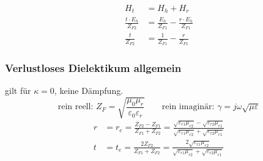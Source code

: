 %

\begin{align*}
    H_t                         & = H_h + H_r                                          \\
    \frac{t\cdot E_{h}}{Z_{F2}} & = \frac{E_{h}}{Z_{F1}} - \frac{r\cdot E_{h}}{Z_{F1}} \\
    \frac{t}{Z_{F2}}            & = \frac{1}{Z_{F1}} - \frac{r}{Z_{F1}}
\end{align*}




\subsubsection[Senkrechter Einfall ideales/verlustl. Dielekt.]{Verlustloses Dielektikum allgemein}
gilt für $ \kappa =0 $, keine Dämpfung.
\[ \text{rein reell: }Z_F=  \sqrt{\frac{\mu_0\mu_r}{\varepsilon_0\varepsilon_r}}  \qquad
\text{rein imaginär: }\gamma  = j \omega\sqrt{\mu\varepsilon} \]
\begin{align*}
    r & = r_e =\frac{Z_{F2} - Z_{F1}}{Z_{F1} + Z_{F2}} = \frac{\sqrt{\varepsilon_{r1}\mu_{r2}} - \sqrt{\varepsilon_{r2}\mu_{r1}} }{\sqrt{\varepsilon_{r1}\mu_{r2}}+{\sqrt{\varepsilon_{r2}\mu_{r1}}}} \\
    t & = t_e = \frac{2 Z_{F2}}{Z_{F1} + Z_{F2}} = \frac{2\sqrt{\varepsilon_{r1}\mu_{r2}}}{\sqrt{\varepsilon_{r1}\mu_{r2}}+\sqrt{\varepsilon_{r2}\mu_{r1}}}
\end{align*}

